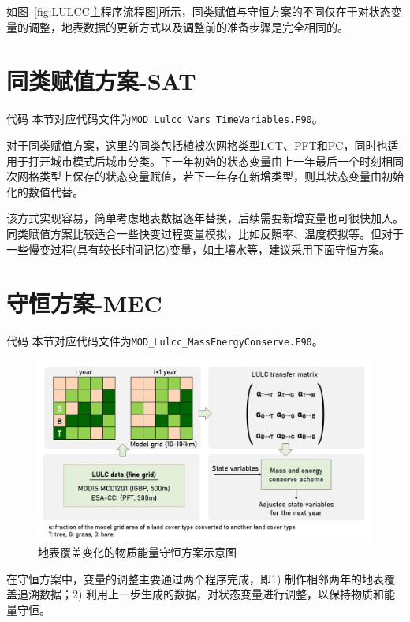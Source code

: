 如图~\ref{fig:LULCC主程序流程图}所示，同类赋值与守恒方案的不同仅在于对状态变量的调整，地表数据的更新方式以及调整前的准备步骤是完全相同的。

\section{同类赋值方案-SAT}
\begin{mymdframed}{代码}
  本节对应代码文件为\texttt{MOD\_Lulcc\_Vars\_TimeVariables.F90}。
\end{mymdframed}

对于同类赋值方案，这里的同类包括植被次网格类型LCT、PFT和PC，同时也适用于打开城市模式后城市分类。下一年初始的状态变量由上一年最后一个时刻相同次网格类型上保存的状态变量赋值，若下一年存在新增类型，则其状态变量由初始化的数值代替。

该方式实现容易，简单考虑地表数据逐年替换，后续需要新增变量也可很快加入。同类赋值方案比较适合一些快变过程变量模拟，比如反照率、温度模拟等。但对于一些慢变过程(具有较长时间记忆)变量，如土壤水等，建议采用下面守恒方案。

\section{守恒方案-MEC}
\begin{mymdframed}{代码}
  本节对应代码文件为\texttt{MOD\_Lulcc\_MassEnergyConserve.F90}。
\end{mymdframed}

{
  \begin{figure}[htbp]
    \centering
    \includegraphics[width=\textwidth]{Figures/土地利用与土地覆盖变化模拟/LULCC流程图.png}
    \caption{地表覆盖变化的物质能量守恒方案示意图}
    \label{fig:LULCC流程图}
  \end{figure}
}

在守恒方案中，变量的调整主要通过两个程序完成，即1) 制作相邻两年的地表覆盖追溯数据；2) 利用上一步生成的数据，对状态变量进行调整，以保持物质和能量守恒。

